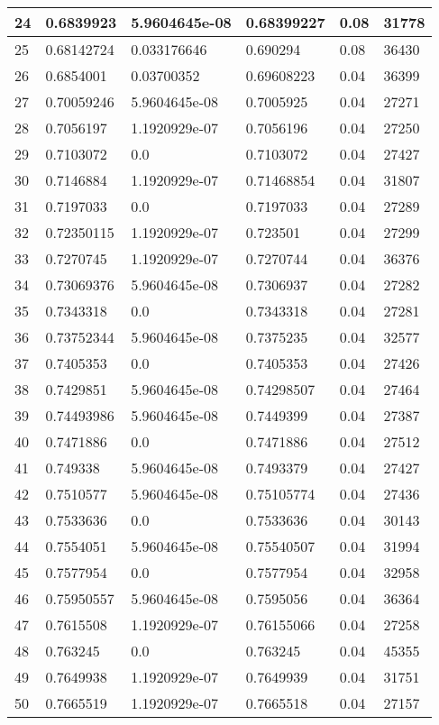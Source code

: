 \begin{longtable}{|l|l|l|l|l|l|}
24 & 0.6839923 & 5.9604645e-08 & 0.68399227 & 0.08 & 31778 \\ \hline 
25 & 0.68142724 & 0.033176646 & 0.690294 & 0.08 & 36430 \\ \hline 
26 & 0.6854001 & 0.03700352 & 0.69608223 & 0.04 & 36399 \\ \hline 
27 & 0.70059246 & 5.9604645e-08 & 0.7005925 & 0.04 & 27271 \\ \hline 
28 & 0.7056197 & 1.1920929e-07 & 0.7056196 & 0.04 & 27250 \\ \hline 
29 & 0.7103072 & 0.0 & 0.7103072 & 0.04 & 27427 \\ \hline 
30 & 0.7146884 & 1.1920929e-07 & 0.71468854 & 0.04 & 31807 \\ \hline 
31 & 0.7197033 & 0.0 & 0.7197033 & 0.04 & 27289 \\ \hline 
32 & 0.72350115 & 1.1920929e-07 & 0.723501 & 0.04 & 27299 \\ \hline 
33 & 0.7270745 & 1.1920929e-07 & 0.7270744 & 0.04 & 36376 \\ \hline 
34 & 0.73069376 & 5.9604645e-08 & 0.7306937 & 0.04 & 27282 \\ \hline 
35 & 0.7343318 & 0.0 & 0.7343318 & 0.04 & 27281 \\ \hline 
36 & 0.73752344 & 5.9604645e-08 & 0.7375235 & 0.04 & 32577 \\ \hline 
37 & 0.7405353 & 0.0 & 0.7405353 & 0.04 & 27426 \\ \hline 
38 & 0.7429851 & 5.9604645e-08 & 0.74298507 & 0.04 & 27464 \\ \hline 
39 & 0.74493986 & 5.9604645e-08 & 0.7449399 & 0.04 & 27387 \\ \hline 
40 & 0.7471886 & 0.0 & 0.7471886 & 0.04 & 27512 \\ \hline 
41 & 0.749338 & 5.9604645e-08 & 0.7493379 & 0.04 & 27427 \\ \hline 
42 & 0.7510577 & 5.9604645e-08 & 0.75105774 & 0.04 & 27436 \\ \hline 
43 & 0.7533636 & 0.0 & 0.7533636 & 0.04 & 30143 \\ \hline 
44 & 0.7554051 & 5.9604645e-08 & 0.75540507 & 0.04 & 31994 \\ \hline 
45 & 0.7577954 & 0.0 & 0.7577954 & 0.04 & 32958 \\ \hline 
46 & 0.75950557 & 5.9604645e-08 & 0.7595056 & 0.04 & 36364 \\ \hline 
47 & 0.7615508 & 1.1920929e-07 & 0.76155066 & 0.04 & 27258 \\ \hline 
48 & 0.763245 & 0.0 & 0.763245 & 0.04 & 45355 \\ \hline 
49 & 0.7649938 & 1.1920929e-07 & 0.7649939 & 0.04 & 31751 \\ \hline 
50 & 0.7665519 & 1.1920929e-07 & 0.7665518 & 0.04 & 27157 \\ \hline 
\end{longtable}